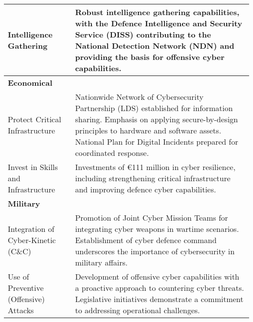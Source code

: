\begin{table}[h]
\begin{tabular}{>{\raggedright}p{4cm} p{11cm}}
        \hspace{0.2cm} Intelligence Gathering & Robust intelligence gathering capabilities, with the Defence Intelligence and Security Service (DISS) contributing to the National Detection Network (NDN) and providing the basis for offensive cyber capabilities. \\
        \midrule
        \textbf{Economical} & \\
        \hspace{0.2cm} Protect Critical Infrastructure & Nationwide Network of Cybersecurity Partnership (LDS) established for information sharing. Emphasis on applying secure-by-design principles to hardware and software assets. National Plan for Digital Incidents prepared for coordinated response. \\
        \hspace{0.2cm} Invest in Skills and Infrastructure & Investments of €111 million in cyber resilience, including strengthening critical infrastructure and improving defence cyber capabilities. \\
        \midrule
        \textbf{Military} & \\
        \hspace{0.2cm} Integration of Cyber-Kinetic (C\&C) & Promotion of Joint Cyber Mission Teams for integrating cyber weapons in wartime scenarios. Establishment of cyber defence command underscores the importance of cybersecurity in military affairs. \\
        \hspace{0.2cm} Use of Preventive (Offensive) Attacks & Development of offensive cyber capabilities with a proactive approach to countering cyber threats. Legislative initiatives demonstrate a commitment to addressing operational challenges. \\
        \bottomrule
    \end{tabular}
\end{table}







